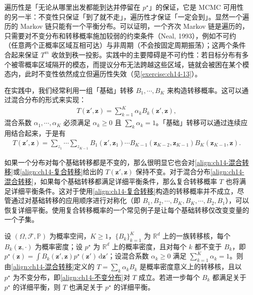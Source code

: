 \documentclass[../../main.tex]{subfiles}
\begin{document}
\begin{remark}遍历性是「无论从哪里出发都能到达并停留在 $p^{\star}$」的保证，它是 MCMC 可用性的另一半：不变性只保证「到了就不走」，遍历性才保证「一定会到」。显然一个遍历的 Markov 链只能有一个平衡分布。可以证明，一个齐次 Markov 链是遍历的，只需要对不变分布和转移概率施加较弱的约束条件（Neal, 1993），例如不可约（任意两个正概率区域互相可达）与非周期（不会按固定周期振荡）；这两个条件合起来保证 $T^{m}$ 收敛到秩一投影。实践中的主要障碍是不可约性：若目标分布有多个被零概率区域隔开的模态，而提议分布无法跨越这些区域，链就会被困在某个模态内，此时不变性依然成立但遍历性失效（见\cref{exercise:ch14-13}）。
\end{remark}

在实践中，我们经常利用一组「基础」转移 $B_{1},\cdots,B_{K}$ 来构造转移概率。这可以通过混合分布的形式来实现：
\begin{align}
T\!\left(\bm{z}',\bm{z}\right)=\sum_{k=1}^{K}\alpha_{k}B_{k}\!\left(\bm{z}',\bm{z}\right),
\label{align:ch14-混合转移}
\end{align}
混合系数 $\alpha_{1},\cdots,\alpha_{K}$ 必须满足 $\alpha_{k}\geqslant 0$ 且 $\sum_{k}\alpha_{k}=1$。「基础」转移可以通过连续应用结合起来，于是有
\begin{align}
T\!\left(\bm{z}',\bm{z}\right)=\sum_{z_{1}}\cdots\sum_{z_{K-1}}B_{1}\!\left(\bm{z}',\bm{z}_{1}\right)\cdots B_{K-1}\!\left(\bm{z}_{K-2},\bm{z}_{K-1}\right)B_{K}\!\left(\bm{z}_{K-1},\bm{z}\right).
\label{align:ch14-复合转移}
\end{align}

如果一个分布对每个基础转移都是不变的，那么很明显它也会对\eqref{align:ch14-混合转移}或\eqref{align:ch14-复合转移}给出的 $T\!\left(\bm{z}',\bm{z}\right)$ 保持不变。对于混合分布\eqref{align:ch14-混合转移}，如果每个基础转移都满足详细平衡条件，那么复合转移概率 $T$ 也将满足详细平衡条件。这对于使用\eqref{align:ch14-复合转移}构造的转移概率并不成立，尽管通过对基础转移的应用顺序进行对称化（即 $B_{1},B_{2},\cdots,B_{K},B_{K},\cdots,B_{2},B_{1}$），可以恢复详细平衡。使用复合转移概率的一个常见例子是让每个基础转移仅改变变量的一个子集。

\begin{proposition}[混合转移保持不变性]\label{proposition:ch14-混合转移不变}
设 $(\Omega,\mathcal{F},\mathbb{P})$ 为概率空间，$K\geqslant1$，$\{B_{k}\}_{k=1}^{K}$ 为 $\mathbb{R}^{d}$ 上的一族转移核，每个 $B_{k}(\bm{z},\cdot)$ 为概率密度；设 $p^{\star}$ 为 $\mathbb{R}^{d}$ 上的概率密度，且对每个 $k$ 都不变于 $B_{k}$，即 $p^{\star}(\bm{z})=\int B_{k}(\bm{z}',\bm{z})p^{\star}(\bm{z}')\,\mathrm{d}\bm{z}'$；设混合系数 $\alpha_{k}\geqslant0$ 满足 $\sum_{k=1}^{K}\alpha_{k}=1$。则由\eqref{align:ch14-混合转移}定义的 $T=\sum_{k}\alpha_{k}B_{k}$ 是概率密度意义上的转移核，且以 $p^{\star}$ 为不变分布，即\eqref{align:ch14-不变分布}对 $T$ 成立。若进一步每个 $B_{k}$ 都满足关于 $p^{\star}$ 的详细平衡，则 $T$ 也满足关于 $p^{\star}$ 的详细平衡。
\end{proposition}
\end{document}
